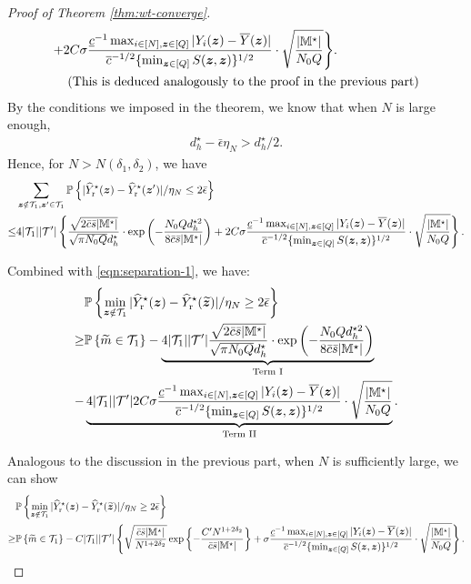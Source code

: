 \documentclass[12pt]{article}
\begin{document}
\begin{proof}[Proof of Theorem \ref{thm:wt-converge}]
\begin{align*}
    + & 2C\sigma   \frac{ \underline{c}^{-1} \max_{i\in[N],{\boldsymbol{z}}\in[Q]}|Y_i({\boldsymbol{z}})-\overline{Y}({\boldsymbol{z}})|}{ {\overline{c}^{-1/2} \{\min_{{\boldsymbol{z}}\in[Q]} S({\boldsymbol{z}},{\boldsymbol{z}})}\}^{1/2}}\cdot \sqrt{\frac{|{\mathbb{M}}^\star|}{N_0Q}}\Bigg\}. \\
    & \text{ (This is deduced analogously to the proof in the previous part)}
\end{align*}
By the conditions we imposed in the theorem, we know that when $N$ is large enough,
\begin{align*}
    d_h^\star - \bar{\epsilon}\eta_N > d_h^\star/2.
\end{align*}
Hence, for $N>N(\delta_1,\delta_2)$, we have
\begin{align*}
    &\sum_{{\boldsymbol{z}}\notin {\mathcal{T}}_{1}, {\boldsymbol{z}}'\in{\mathcal{T}}_{1}}{\mathbb{P}}\left\{|{\widehat{Y}}^\star_{\operatorname{r}}({\boldsymbol{z}}) - {\widehat{Y}}^\star_{\operatorname{r}}({\boldsymbol{z}}')|/\eta_N \le 2\bar{\epsilon}\right\} \\
    \le & 4|{\mathcal{T}}_{1}| |{\mathcal{T}}'|\left\{ \frac{\sqrt{2\bar{c}\bar{s}|{\mathbb{M}}^\star|}}{\sqrt{\pi N_0Q }{d_h^\star}}\cdot \exp\left(-\frac{ N_0Q d_h^{\star 2}}{8\bar{c}\bar{s}|{\mathbb{M}}^\star|}\right)
    +  2C\sigma   \frac{ \underline{c}^{-1} \max_{i\in[N],{\boldsymbol{z}}\in[Q]}|Y_i({\boldsymbol{z}})-\overline{Y}({\boldsymbol{z}})|}{ {\overline{c}^{-1/2} \{\min_{{\boldsymbol{z}}\in[Q]} S({\boldsymbol{z}},{\boldsymbol{z}})}\}^{1/2}}\cdot \sqrt{\frac{|{\mathbb{M}}^\star|}{N_0Q}}\right\}.
\end{align*}


Combined with \eqref{eqn:separation-1},  we have:
\begin{align}
    &{\mathbb{P}}\left\{\min_{{\boldsymbol{z}}\notin {\mathcal{T}}_{1}}|{\widehat{Y}}^\star_{\operatorname{r}}({\boldsymbol{z}}) - {\widehat{Y}}^\star_{\operatorname{r}}(\widetilde{{\boldsymbol{z}}})|/\eta_N \ge 2\bar{\epsilon}\right\} \notag\\
    \ge & {\mathbb{P}}\left\{\widetilde{m}\in {\mathcal{T}}_{1}\right\} -   \underbrace{4|{\mathcal{T}}_{1}| |{\mathcal{T}}'|  \frac{\sqrt{2\bar{c}\bar{s}|{\mathbb{M}}^\star|}}{\sqrt{\pi N_0Q }{d_h^\star}}\cdot \exp\left(-\frac{ N_0Q d_h^{\star 2}}{8\bar{c}\bar{s}|{\mathbb{M}}^\star|}\right)}_{\text{Term I}}\notag\\
    - &  \underbrace{4|{\mathcal{T}}_{1}| |{\mathcal{T}}'| 2C\sigma   \frac{ \underline{c}^{-1} \max_{i\in[N],{\boldsymbol{z}}\in[Q]}|Y_i({\boldsymbol{z}})-\overline{Y}({\boldsymbol{z}})|}{ {\overline{c}^{-1/2} \{\min_{{\boldsymbol{z}}\in[Q]} S({\boldsymbol{z}},{\boldsymbol{z}})}\}^{1/2}}\cdot \sqrt{\frac{|{\mathbb{M}}^\star|}{N_0Q}}}_{\text{Term II}}. \label{eqn:large}
\end{align}

Analogous to the discussion in the previous part, when $N$ is sufficiently large, we can show
\begin{align*}
    &{\mathbb{P}}\left\{\min_{{\boldsymbol{z}}\notin {\mathcal{T}}_{1}}|{\widehat{Y}}^\star_{\operatorname{r}}({\boldsymbol{z}}) - {\widehat{Y}}^\star_{\operatorname{r}}(\widetilde{{\boldsymbol{z}}})|/\eta_N \ge 2\bar{\epsilon}\right\} \\
    \ge & {\mathbb{P}}\left\{\widetilde{m}\in {\mathcal{T}}_{1}\right\} - C|{\mathcal{T}}_{1}| |{\mathcal{T}}'| \left\{\sqrt{\frac{\bar{c}\bar{s}|{\mathbb{M}}^\star|}{N^{1+2\delta_2}}}\exp\left\{-\frac{C'N^{1+2\delta_2}}{\bar{c}\bar{s}|{\mathbb{M}}^\star|}\right\} + \sigma   \frac{ \underline{c}^{-1} \max_{i\in[N],{\boldsymbol{z}}\in[Q]}|Y_i({\boldsymbol{z}})-\overline{Y}({\boldsymbol{z}})|}{ {\overline{c}^{-1/2} \{\min_{{\boldsymbol{z}}\in[Q]} S({\boldsymbol{z}},{\boldsymbol{z}})}\}^{1/2}}\cdot \sqrt{\frac{|{\mathbb{M}}^\star|}{N_0Q}}\right\}.
\end{align*}


\end{proof}
\end{document}
